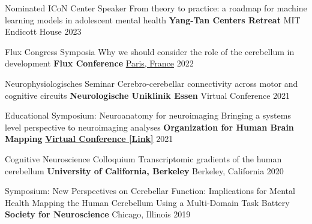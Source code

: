 

\begin{cventries}

  \cventry
    {Nominated ICoN Center Speaker} %
    {From theory to practice: a roadmap for machine learning models in adolescent mental health} %
    {\textbf{Yang-Tan Centers Retreat}} %
    {MIT Endicott House} %
    {2023} %

  \cventry
    {Flux Congress Symposia} %
    {Why we should consider the role of the cerebellum in development} %
    {\textbf{Flux Conference}} %
    {\href{https://youtu.be/u0O88zD28f4?si=uFwx1z4Sw68Qlg5d}{Paris, France}} %
    {2022} %

  \cventry
    {Neurophysiologisches Seminar} %
    {Cerebro-cerebellar connectivity across motor and cognitive circuits} %
    {\textbf{Neurologische Uniklinik Essen}} %
    {Virtual Conference} %
    {2021} %

  \cventry
    {Educational Symposium: Neuroanatomy for neuroimaging} %
    {Bringing a systems level perspective to neuroimaging analyses} %
    {\textbf{Organization for Human Brain Mapping}} %
    {\href{https://www.youtube.com/watch?v=L6nwkvBqJzI}{\textbf{Virtual Conference [Link]}}} %
    {2021} %
    
  \cventry
    {Cognitive Neuroscience Colloquium} %
    {Transcriptomic gradients of the human cerebellum} %
    {\textbf{University of California, Berkeley}} %
    {Berkeley, California} %
    {2020} %

  \cventry
    {Symposium: New Perspectives on Cerebellar Function: Implications for Mental Health} %
    {Mapping the Human Cerebellum Using a Multi-Domain Task Battery} %
    {\textbf{Society for Neuroscience}} %
    {Chicago, Illinois} %
    {2019} %
    

\end{cventries}
